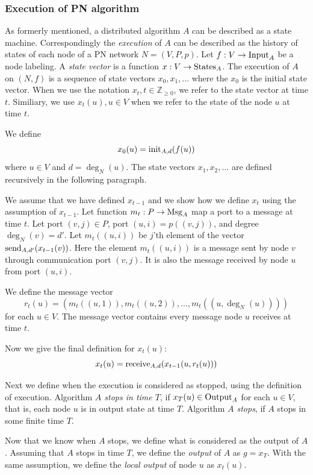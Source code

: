 \subsubsection{Execution of PN algorithm}

As formerly mentioned, a distributed algorithm $A$ can be described as a state machine.
Correspondingly the \emph{execution} of $A$ can be described as the history of states of each node of a PN network $N=(V, P, p)$.
Let $f: V \rightarrow \operatorname{Input}_A$ be a node labeling.
A \emph{state vector} is a function $x: V \rightarrow \operatorname{States}_A$.
The execution of $A$ on $(N, f)$ is a sequence of state vectors $x_0, x_1, ...$ where the $x_0$ is the initial state vector.
When we use the notation $x_t, t \in \mathbb{Z}_{\geq 0}$, we refer to the state vector at time $t$.
Similiary, we use $x_t(u), u \in V$ when we refer to the state of the node $u$ at time $t$.

We define $$x_0(u) = \operatorname{init}_{A,d}(f(u))$$ where $u\in V$ and $d=\deg_N(u)$.
The state vectors $x_1, x_2, ...$ are defined recursively in the following paragraph.

We assume that we have defined $x_{t-1}$ and we show how we define $x_{t}$ using the assumption of $x_{t-1}$.
Let function $m_t: P \rightarrow \operatorname{Msg}_A$ map a port to a message at time $t$.
Let port $(v, j) \in P$, port $(u, i) = p((v, j))$, and degree $\deg_N(v) = d'$.
Let $m_t((u, i))$ be $j$'th element of the vector $\operatorname{send}_{A, d'}(x_{t-1}(v))$.
Here the element $m_t((u, i))$ is a message sent by node $v$ through communication port $(v, j)$.
It is also the message received by node $u$ from port $(u, i)$.

We define the message vector $$r_t(u)=(m_t((u, 1)), m_t((u, 2)), ..., m_t((u, \deg_N(u))))$$ for each $u\in V$.
The message vector contains every message node $u$ receives at time $t$.

Now we give the final definition for $x_t(u)$:
$$x_t(u) = \operatorname{receive}_{A,d}(x_{t-1}(u, r_t(u)))$$

Next we define when the execution is considered as stopped, using the definition of execution.
Algorithm \emph{$A$ stops in time $T$}, if $x_T(u) \in \operatorname{Output}_A$ for each $u \in V$, that is, each node $u$ is in output state at time $T$.
Algorithm \emph{$A$ stops}, if $A$ stops in some finite time $T$.


Now that we know when $A$ stops, we define what is considered as the output of $A$.
Assuming that $A$ stops in time $T$, we define the \emph{output} of $A$ as $g=x_T$.
With the same assumption, we define the \emph{local output} of node $u$ as $x_t(u)$.



